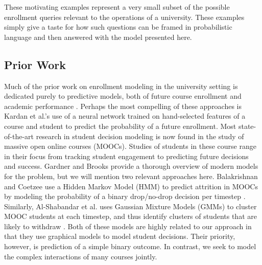 \documentclass{edm_template}
\newcommand{\piech}[1]{{\color{purple}{[cjp: #1]}}}
\begin{document}
These motivating examples represent a very small subset of the possible enrollment queries relevant to the operations of a university. These examples simply give a taste for how such questions can be framed in probabilistic language and then answered with the model presented here. 

\subsection{Prior Work}

Much of the prior work on enrollment modeling in the university setting is dedicated purely to predictive models, both of future course enrollment \cite{kardan2013prediction}\cite{nandeshwar2009enrollment}\cite{song1993new} and academic performance \cite{kovacic2010early}\cite{hlosta2017ouroboros}.
Perhaps the most compelling of these approaches is Kardan et al.'s use of a neural network trained on hand-selected features of a course and student to predict the probability of a future enrollment.  
Most state-of-the-art research in student decision modeling is now found in the study of massive open online courses (MOOCs). Studies of students in these course range in their focus from tracking student engagement to predicting future decisions and success. Gardner and Brooks \cite{Gardner2018StudentSP} provide a thorough overview of modern models for the problem, but we will mention two relevant approaches here. Balakrishnan and Coetzee use a Hidden Markov Model (HMM) to predict attrition in MOOCs by modeling the probability of a binary drop/no-drop decision per timestep \cite{balakrishnan2013predicting}. Similarly, Al-Shabandar et al. uses Gaussian Mixture Models (GMMs) to cluster MOOC students at each timestep, and thus identify clusters of students that are likely to withdraw  \cite{AlShabandar2018TheAO}. Both of these models are highly related to our approach in that they use graphical models to model student decisions. Their priority, however, is prediction of a simple binary outcome. In contrast, we seek to model the complex interactions of many courses jointly.

\piech{Include a paragraph on Bayesian Knowledge Tracing. This is 10/10 important for two reasons. One BKT is well known by the EDM and education community and some reveiwers are going to confuse the two and perhaps think you are solving a different problem. Here is an example paragraph. Not great writing but a start:}

\piech{Hidden Markov Models have historically been the ubiquitous solution to the ``Knowledge Tracing" task where students latent understanding is tracked as they provide answers to questions (CITE original BKT paper). Corbett & Anderson’s Bayesian Knowledge Tracing model
is now used to model student knowledge for computer programming, math and beyond (CITE a lot, see this paper for references: More Accurate Student Modeling through Contextual Estimation of Slip and Guess Probabilities in Bayesian Knowledge Tracing). 
Our work is different in two ways (1) we are using bayesian models to track students across courses using course performance as inputs and (2) We use a different type of Hidden Markov Model that can do XYZ (explain the delta from vanilla HMM to your GMM). }
\end{document}
